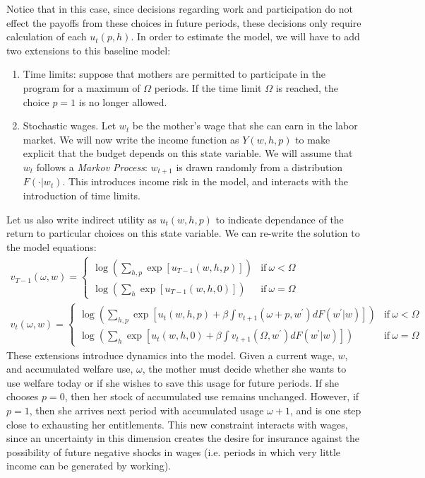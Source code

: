 \documentclass[12pt]{article}
\numberwithin{equation}{section}
\numberwithin{figure}{section}
\numberwithin{table}{section}
\begin{document}
Notice that in this case, since decisions regarding work and participation do not effect the payoffs from these choices in future periods, these decisions only require calculation of each $u_t(p,h)$. In order to estimate the model, we will have to add two extensions to this baseline model:
\begin{enumerate}
\item Time limits: suppose that mothers are permitted to participate in the program for a maximum of $\Omega$ periods. If the time limit $\Omega$ is reached, the choice $p=1$ is no longer allowed.
\item Stochastic wages. Let $w_t$ be the mother's wage that she can earn in the labor market. We will now write the income function as $Y(w,h,p)$ to make explicit that the budget depends on this state variable. We will assume that $w_t$ follows a \emph{Markov Process}: $w_{t+1}$ is drawn randomly from a distribution $F(\cdot|w_t)$. This introduces income risk in the model, and interacts with the introduction of time limits.
\end{enumerate}
Let us also write indirect utility as $u_t(w,h,p)$ to indicate dependance of the return to particular choices on this state variable. We can re-write the solution to the model equations:
\begin{eqnarray}
v_{T-1}(\omega,w) = \left\{\begin{array}{ll}\log\left(\sum_{h,p}\exp[u_{T-1}(w,h,p)]\right) & \text{if}\ \omega<\Omega  \\
\log\left(\sum_{h}\exp[u_{T-1}(w,h,0)]\right) & \text{if}\ \omega=\Omega\end{array}\right. \nonumber \\
v_t(\omega,w) = \left\{\begin{array}{ll}\log\left(\sum_{h,p}\exp[u_{t}(w,h,p) + \beta\int v_{t+1}(\omega+p,w^\prime)dF(w^\prime|w)]\right) & \text{if}\ \omega<\Omega \\
\log\left(\sum_{h}\exp[u_{t}(w,h,0) + \beta\int v_{t+1}(\Omega,w^\prime)dF(w^\prime|w)]\right) & \text{if}\ \omega=\Omega\end{array}\right.\nonumber
\end{eqnarray}
These extensions introduce dynamics into the model. Given a current wage, $w$, and accumulated welfare use, $\omega$, the mother must decide whether she wants to use welfare today or if she wishes to save this usage for future periods. If she chooses $p=0$, then her stock of accumulated use remains unchanged. However, if $p=1$, then she arrives next period with accumulated usage $\omega+1$, and is one step close to exhausting her entitlements. This new constraint interacts with wages, since an uncertainty in this dimension creates the desire for insurance against the possibility of future negative shocks in wages (i.e. periods in which very little income can be generated by working).
\end{document}
